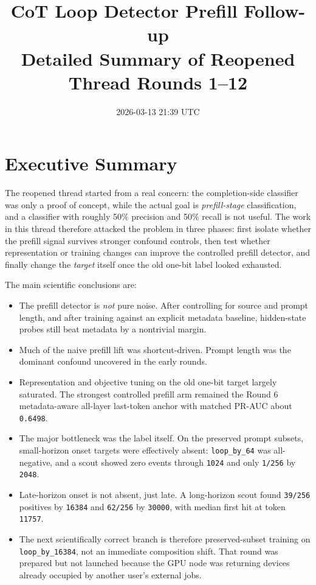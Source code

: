 \documentclass[11pt]{article}
\title{CoT Loop Detector Prefill Follow-up\\Detailed Summary of Reopened Thread Rounds 1--12}
\author{}
\date{2026-03-13 21:39 UTC}
\begin{document}
\maketitle

\section*{Executive Summary}
The reopened thread started from a real concern: the completion-side classifier was only a proof of concept, while the actual goal is \emph{prefill-stage} classification, and a classifier with roughly 50\% precision and 50\% recall is not useful. The work in this thread therefore attacked the problem in three phases: first isolate whether the prefill signal survives stronger confound controls, then test whether representation or training changes can improve the controlled prefill detector, and finally change the \emph{target} itself once the old one-bit label looked exhausted.

The main scientific conclusions are:
\begin{itemize}
  \item The prefill detector is \emph{not} pure noise. After controlling for source and prompt length, and after training against an explicit metadata baseline, hidden-state probes still beat metadata by a nontrivial margin.
  \item Much of the naive prefill lift was shortcut-driven. Prompt length was the dominant confound uncovered in the early rounds.
  \item Representation and objective tuning on the old one-bit target largely saturated. The strongest controlled prefill arm remained the Round 6 metadata-aware all-layer last-token anchor with matched PR-AUC about \texttt{0.6498}.
  \item The major bottleneck was the label itself. On the preserved prompt subsets, small-horizon onset targets were effectively absent: \texttt{loop\_by\_64} was all-negative, and a scout showed zero events through \texttt{1024} and only \texttt{1/256} by \texttt{2048}.
  \item Late-horizon onset is not absent, just late. A long-horizon scout found \texttt{39/256} positives by \texttt{16384} and \texttt{62/256} by \texttt{30000}, with median first hit at token \texttt{11757}.
  \item The next scientifically correct branch is therefore preserved-subset training on \texttt{loop\_by\_16384}, not an immediate composition shift. That round was prepared but not launched because the GPU node was returning devices already occupied by another user's external jobs.
\end{itemize}
\end{document}
